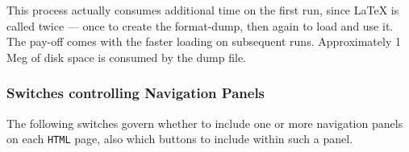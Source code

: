 \begin{htmllist}
\begin{changebar}
This process actually consumes additional time on the first run,
since \LaTeX{} is called twice --- once to create the format-dump,
then again to load and use it.
The pay-off comes with the faster loading on subsequent runs.
Approximately 1 Meg of disk space is consumed by the dump file.
\end{changebar}
%
\end{htmllist}


\subsubsection{Switches controlling Navigation Panels\label{navoptions}}
%
The following switches govern whether to include one or more navigation
panels on each \texttt{HTML} page,
also which buttons to include within such a panel.

